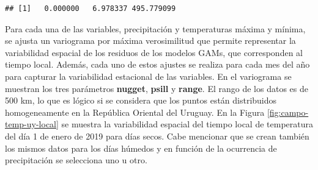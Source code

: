 \documentclass[
  12pt]{article}
\begin{document}
\begin{verbatim}
## [1]   0.000000   6.978337 495.779099
\end{verbatim}

Para cada una de las variables, precipitación y temperaturas máxima y mínima, se ajusta un variograma por máxima verosimilitud que permite representar la variabilidad espacial de los residuos de los modelos GAMs, que corresponden al tiempo local. Además, cada uno de estos ajustes se realiza para cada mes del año para capturar la variabilidad estacional de las variables. En el variograma se muestran los tres parámetros \textbf{nugget}, \textbf{psill} y \textbf{range}. El rango de los datos es de 500 km, lo que es lógico si se considera que los puntos están distribuidos homogeneamente en la República Oriental del Uruguay.
En la Figura \ref{fig:campo-temp-uy-local} se muestra la variabilidad espacial del tiempo local de temperatura del día 1 de enero de 2019 para días secos. Cabe mencionar que se crean también los mismos datos para los días húmedos y en función de la ocurrencia de precipitación se selecciona uno u otro.
\end{document}
